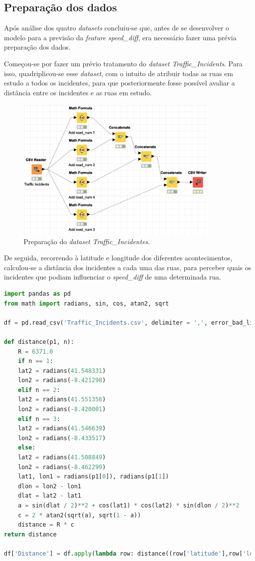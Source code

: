 \documentclass[a4paper, 12pt]{article}
\begin{document}
\subsection{Preparação dos dados}

Após análise dos quatro \textit{datasets} concluiu-se que, antes de se desenvolver o modelo para a previsão da \textit{feature speed\_diff}, era necessário fazer uma prévia preparação dos dados.

Começou-se por fazer um prévio tratamento do \textit{dataset Traffic\_Incidents}. Para isso, quadriplicou-se esse \textit{dataset}, com o intuito de atribuir todas as ruas em estudo a todos os incidentes, para que posteriormente fosse possível avaliar a distância entre os incidentes e as ruas em estudo. 

\begin{figure}[H]
	\centering
	\includegraphics[width=10cm]{Traffic_Incidents}
	\caption{Preparação do \textit{dataset Traffic\_Incidentes}.}
\end{figure}

De seguida, recorrendo à latitude e longitude dos diferentes acontecimentos, calculou-se a distância dos incidentes a cada uma das ruas, para perceber quais os incidentes que podiam influenciar o \textit{speed\_diff} de uma determinada rua.

\begin{lstlisting}[language=Python]
import pandas as pd
from math import radians, sin, cos, atan2, sqrt

df = pd.read_csv('Traffic_Incidents.csv', delimiter = ',', error_bad_lines = False, encoding = 'ISO-8859-1')

def distance(p1, n):
	R = 6371.0
	if n == 1:
	lat2 = radians(41.548331)
	lon2 = radians(-8.421298)
	elif n == 2:
	lat2 = radians(41.551356)
	lon2 = radians(-8.420001)
	elif n == 3:
	lat2 = radians(41.546639)
	lon2 = radians(-8.433517)
	else:
	lat2 = radians(41.508849)
	lon2 = radians(-8.462299)
	lat1, lon1 = radians(p1[0]), radians(p1[1])
	dlon = lon2 - lon1
	dlat = lat2 - lat1
	a = sin(dlat / 2)**2 + cos(lat1) * cos(lat2) * sin(dlon / 2)**2
	c = 2 * atan2(sqrt(a), sqrt(1 - a))
	distance = R * c
return distance

df['Distance'] = df.apply(lambda row: distance((row['latitude'],row['longitude']), row['road_num']), axis=1)
\end{lstlisting}
\end{document}

